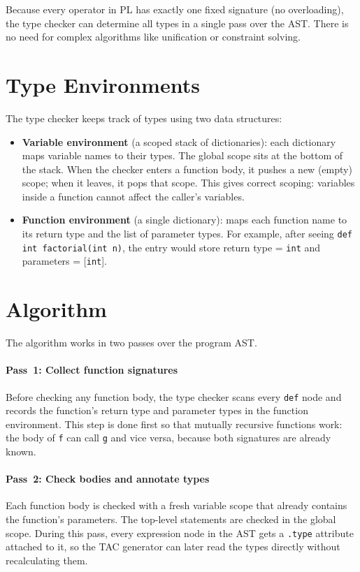 \documentclass[12pt,a4paper]{report}
\newcommand{\tint}{\texttt{int}}
\begin{document}
Because every operator in PL has exactly one fixed signature (no overloading),
the type checker can determine all types in a single pass over the AST.
There is no need for complex algorithms like unification or constraint solving.
 
\section{Type Environments}
 
The type checker keeps track of types using two data structures:
 
\begin{itemize}
  \item \textbf{Variable environment} (a scoped stack of dictionaries):
        each dictionary maps variable names to their types. The global scope
        sits at the bottom of the stack. When the checker enters a function
        body, it pushes a new (empty) scope; when it leaves, it pops that
        scope. This gives correct scoping: variables inside a function cannot
        affect the caller's variables.
  \item \textbf{Function environment} (a single dictionary): maps each
        function name to its return type and the list of parameter types.
        For example, after seeing
        \texttt{def int factorial(int n)}, the entry would store
        return type = \tint{} and parameters = [\tint].
\end{itemize}
 
\section{Algorithm}
 
The algorithm works in two passes over the program AST.
 
\paragraph{Pass~1: Collect function signatures}
Before checking any function body, the type checker scans every \texttt{def}
node and records the function's return type and parameter types in the
function environment. This step is done first so that mutually recursive
functions work: the body of \texttt{f} can call \texttt{g} and vice versa,
because both signatures are already known.
 
\paragraph{Pass~2: Check bodies and annotate types}
Each function body is checked with a fresh variable scope that already
contains the function's parameters. The top-level statements are checked in
the global scope. During this pass, every expression node in the AST gets
a \texttt{.type} attribute attached to it, so the TAC generator can later
read the types directly without recalculating them.
 
\end{document}
